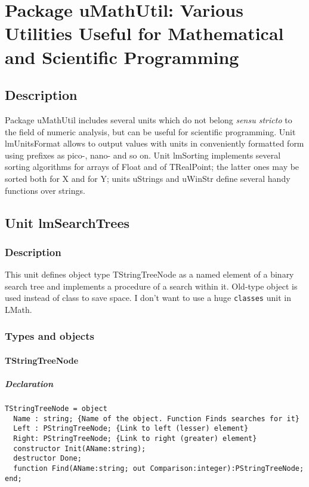 \documentclass[12pt,a4paper,oneside]{report}
\newcommand{\lmath}[1]{   %
	\marginpar{\vspace{#1} 
		\begin{flushright}
			LMath
	\end{flushright} }
}
\newcommand{\code}[1]{\texttt{#1}}
\begin{document}
\chapter{Package uMathUtil: Various Utilities Useful for Mathematical and Scientific Programming}\label{package-umathutil}
\section{Description}
Package uMathUtil includes several units which do not belong \textit{sensu stricto} to the field of numeric analysis, but can be useful for scientific programming. Unit lmUnitsFormat allows to output values with units in conveniently formatted form using prefixes as pico-, nano- and so on. Unit lmSorting implements several sorting algorithms for arrays of Float and of TRealPoint; the latter ones may be sorted both for X and for Y; units uStrings and uWinStr define several handy functions over strings.   
\section{Unit lmSearchTrees}\lmath{-24pt}
\label{lmsearchtrees}
\subsection{Description}
This unit defines object type TStringTreeNode as a named element of a binary search tree and implements a procedure of a search within it. Old-type object is used instead of class to save space. I don't want to use a huge \code{classes} unit in LMath.
\subsection{Types and objects}
\subsubsection{TStringTreeNode}
\paragraph{Declaration\\}
\begin{verbatim}
TStringTreeNode = object
  Name : string; {Name of the object. Function Finds searches for it}
  Left : PStringTreeNode; {Link to left (lesser) element}
  Right: PStringTreeNode; {Link to right (greater) element}
  constructor Init(AName:string);
  destructor Done;
  function Find(AName:string; out Comparison:integer):PStringTreeNode;
end;
\end{verbatim}
\end{document}
